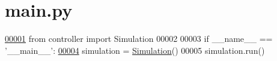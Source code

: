 \hypertarget{main_8py_source}{\section{main.\+py}
}

\begin{DoxyCode}
\hypertarget{main_8py_source_l00001}{}\hyperlink{namespacemain}{00001} \textcolor{keyword}{from} controller \textcolor{keyword}{import} Simulation
00002 
00003 \textcolor{keywordflow}{if} \_\_name\_\_ == \textcolor{stringliteral}{'\_\_main\_\_'}:
\hypertarget{main_8py_source_l00004}{}\hyperlink{namespacemain_a587e23faee5ea0116a33678f99304c82}{00004}     simulation = \hyperlink{classcontroller_1_1Simulation}{Simulation}()
00005     simulation.run()
\end{DoxyCode}
